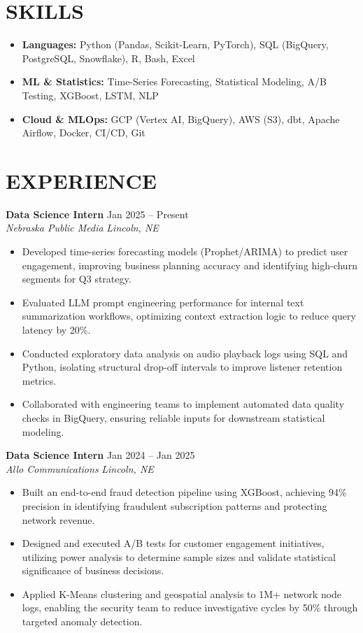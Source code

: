 \section*{SKILLS}
\begin{itemize}[leftmargin=0.7em, label={}, itemsep=0pt, parsep=0pt, topsep=0pt]
  \item \textbf{Languages:} Python (Pandas, Scikit-Learn, PyTorch), SQL (BigQuery, PostgreSQL, Snowflake), R, Bash, Excel
  \item \textbf{ML \& Statistics:} Time-Series Forecasting, Statistical Modeling, A/B Testing, XGBoost, LSTM, NLP
  \item \textbf{Cloud \& MLOps:} GCP (Vertex AI, BigQuery), AWS (S3), dbt, Apache Airflow, Docker, CI/CD, Git
\end{itemize}

\section*{EXPERIENCE}

\textbf{Data Science Intern} \hfill Jan 2025 -- Present \\
\textit{Nebraska Public Media} \hfill \textit{Lincoln, NE}
\begin{itemize}
  \item Developed time-series forecasting models (Prophet/ARIMA) to predict user engagement, improving business planning accuracy and identifying high-churn segments for Q3 strategy.
  \item Evaluated LLM prompt engineering performance for internal text summarization workflows, optimizing context extraction logic to reduce query latency by 20\%.
  \item Conducted exploratory data analysis on audio playback logs using SQL and Python, isolating structural drop-off intervals to improve listener retention metrics.
  \item Collaborated with engineering teams to implement automated data quality checks in BigQuery, ensuring reliable inputs for downstream statistical modeling.
\end{itemize}


\vspace{4pt}


\textbf{Data Science Intern} \hfill Jan 2024 -- Jan 2025 \\
\textit{Allo Communications} \hfill \textit{Lincoln, NE}
\begin{itemize}
  \item Built an end-to-end fraud detection pipeline using XGBoost, achieving 94\% precision in identifying fraudulent subscription patterns and protecting network revenue.
  \item Designed and executed A/B tests for customer engagement initiatives, utilizing power analysis to determine sample sizes and validate statistical significance of business decisions.
  \item Applied K-Means clustering and geospatial analysis to 1M+ network node logs, enabling the security team to reduce investigative cycles by 50\% through targeted anomaly detection.
\end{itemize}

